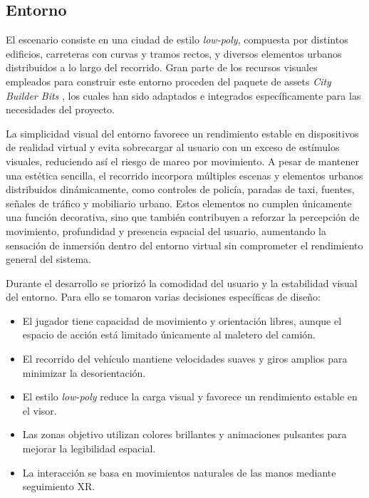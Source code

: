 \documentclass[12pt, a4paper]{article}
\begin{document}
\subsection{Entorno}

El escenario consiste en una ciudad de estilo \textit{low-poly}, compuesta por distintos edificios, carreteras con curvas y tramos rectos, y diversos elementos urbanos distribuidos a lo largo del recorrido. Gran parte de los recursos visuales empleados para construir este entorno proceden del paquete de assets \textit{City Builder Bits} \cite{citybuilderbits}, los cuales han sido adaptados e integrados específicamente para las necesidades del proyecto.


La simplicidad visual del entorno favorece un rendimiento estable en dispositivos de realidad virtual y evita sobrecargar al usuario con un exceso de estímulos visuales, reduciendo así el riesgo de mareo por movimiento. A pesar de mantener una estética sencilla, el recorrido incorpora múltiples escenas y elementos urbanos distribuidos dinámicamente, como controles de policía, paradas de taxi, fuentes, señales de tráfico y mobiliario urbano. Estos elementos no cumplen únicamente una función decorativa, sino que también contribuyen a reforzar la percepción de movimiento, profundidad y presencia espacial del usuario, aumentando la sensación de inmersión dentro del entorno virtual sin comprometer el rendimiento general del sistema.


Durante el desarrollo se priorizó la comodidad del usuario y la estabilidad visual del entorno. Para ello se tomaron varias decisiones específicas de diseño:

\begin{itemize}[leftmargin=*]
    \item El jugador tiene capacidad de movimiento y orientación libres, aunque el espacio de acción está limitado únicamente al maletero del camión.
    \item El recorrido del vehículo mantiene velocidades suaves y giros amplios para minimizar la desorientación.
    \item El estilo \textit{low-poly} reduce la carga visual y favorece un rendimiento estable en el visor.
    \item Las zonas objetivo utilizan colores brillantes y animaciones pulsantes para mejorar la legibilidad espacial.
    \item La interacción se basa en movimientos naturales de las manos mediante seguimiento XR.
\end{itemize}
\end{document}
